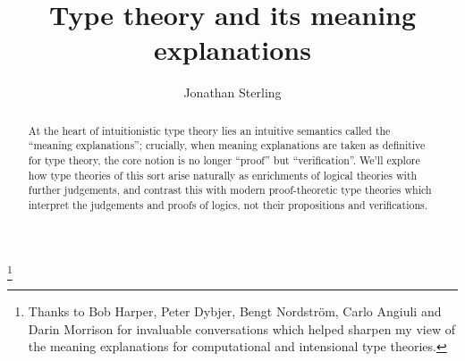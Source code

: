 \documentclass{amsbook}
\theoremstyle{definition}
\theoremstyle{remark}
\numberwithin{equation}{section}
\begin{document}
\title{Type theory and its meaning explanations}
\author{Jonathan Sterling}

\thanks{Thanks to Bob Harper, Peter Dybjer, Bengt Nordstr\"om, Carlo Angiuli and
Darin Morrison for invaluable conversations which helped sharpen my view of the
meaning explanations for computational and intensional type theories.}


\maketitle

\begin{abstract}
  At the heart of intuitionistic type theory lies an intuitive semantics called
  the ``meaning explanations''; crucially, when meaning explanations are taken as
  definitive for type theory, the core notion is no longer ``proof'' but
  ``verification''. We'll explore how type theories of this sort arise naturally
  as enrichments of logical theories with further judgements, and contrast this
  with modern proof-theoretic type theories which interpret the judgements and
  proofs of logics, not their propositions and verifications.
\end{abstract}

\onehalfspacing

\tableofcontents







\nocite{*}

\end{document}
